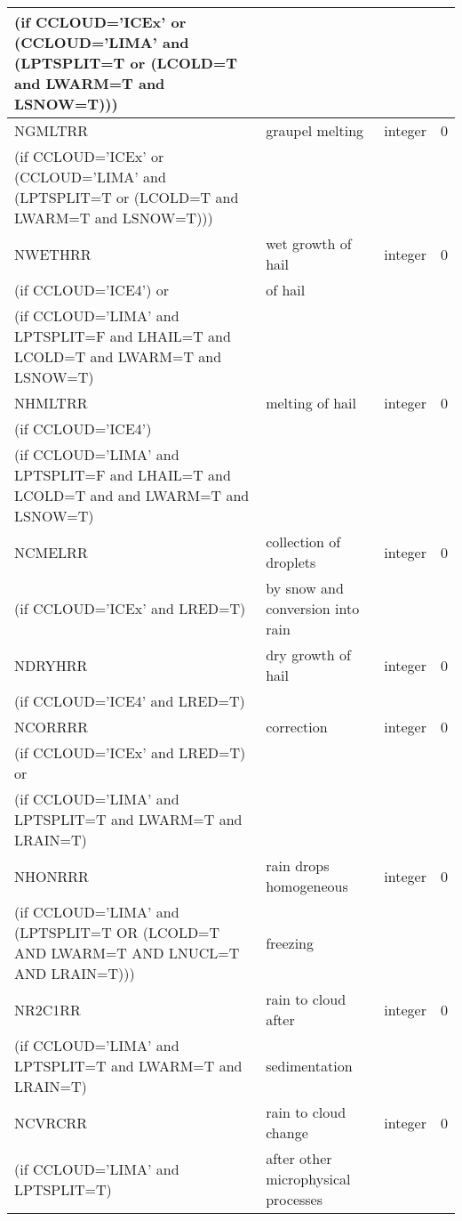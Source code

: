 \begin{longtable} {|p{}|p{}|>{\centering}p{}|p{}<{\centering}|}
(if CCLOUD='ICEx' or (CCLOUD='LIMA' and (LPTSPLIT=T or (LCOLD=T and LWARM=T and LSNOW=T))) & & & \\\hline
NGMLTRR  & graupel melting& integer  &  0 \index{NGMLTRR!\innam{NAM\_BU\_RRR}}\\ \nopagebreak
(if CCLOUD='ICEx' or (CCLOUD='LIMA' and (LPTSPLIT=T or (LCOLD=T and LWARM=T and LSNOW=T))) & & & \\\hline
NWETHRR  & wet growth of hail & integer  &  0 \index{NWETHRR!\innam{NAM\_BU\_RRR}}\\ \nopagebreak
(if CCLOUD='ICE4') or &of hail &   &  \\
(if CCLOUD='LIMA' and LPTSPLIT=F and LHAIL=T and LCOLD=T and LWARM=T and LSNOW=T) & &   &  \\\hline
NHMLTRR  & melting of hail& integer  &  0 \index{NHMLTRR!\innam{NAM\_BU\_RRR}}\\ \nopagebreak
(if CCLOUD='ICE4')   &   &       &   \\ \nopagebreak
(if CCLOUD='LIMA' and LPTSPLIT=F and LHAIL=T and LCOLD=T and and LWARM=T and LSNOW=T)   &  &        &   \\\hline
NCMELRR  & collection of droplets & integer  &  0 \index{NCMELRR!\innam{NAM\_BU\_RRR}}\\ \nopagebreak
(if CCLOUD='ICEx' and LRED=T) & by snow and conversion into rain &   &  \\\hline
NDRYHRR  & dry growth of hail & integer  &  0 \index{NDRYHRR!\innam{NAM\_BU\_RRR}}\\ \nopagebreak
(if CCLOUD='ICE4' and LRED=T) & &   &  \\\hline
NCORRRR  & correction & integer  &  0 \index{NCORRRR!\innam{NAM\_BU\_RRR}}\\ \nopagebreak
(if CCLOUD='ICEx' and LRED=T) or & &   &  \\ \nopagebreak
(if CCLOUD='LIMA' and LPTSPLIT=T and LWARM=T and LRAIN=T) & &   &  \\\hline
NHONRRR  & rain drops homogeneous  & integer  &  0 \index{NHONRRR!\innam{NAM\_BU\_RRR}}\\ \nopagebreak
(if CCLOUD='LIMA' and (LPTSPLIT=T OR (LCOLD=T AND LWARM=T AND LNUCL=T AND LRAIN=T)))   & freezing  &       &   \\\hline
NR2C1RR & rain to cloud after  & integer  &  0 \index{NR2C1RR!\innam{NAM\_BU\_RRR}}\\ \nopagebreak
(if CCLOUD='LIMA' and LPTSPLIT=T and LWARM=T and LRAIN=T) & sedimentation&   &  \\\hline
NCVRCRR  & rain to cloud change & integer  &  0 \index{NCVRCRR!\innam{NAM\_BU\_RRR}}\\ \nopagebreak
(if CCLOUD='LIMA' and LPTSPLIT=T) &after other microphysical processes &   &  \\\hline
\end{longtable}

